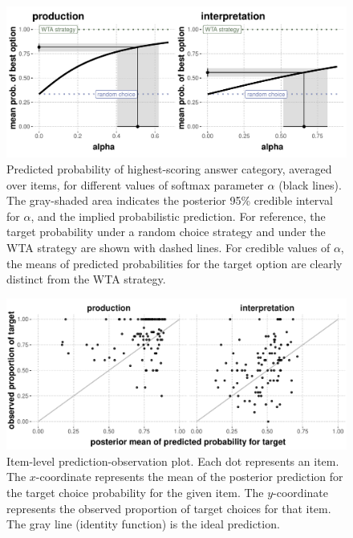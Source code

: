 \documentclass[fleqn]{article}
\begin{document}
\begin{figure}[t]
  \centering
  \includegraphics[width=\textwidth]{00-pics/GPT-closeness-target-by-alpha-item-level.pdf}
  \caption{
    Predicted probability of highest-scoring answer category, averaged over items, for different values of softmax parameter $\alpha$ (black lines).
    The gray-shaded area indicates the posterior 95\% credible interval for $\alpha$, and the implied probabilistic prediction.
    For reference, the target probability under a random choice strategy and under the WTA strategy are shown with dashed lines.
    For credible values of $\alpha$, the means of predicted probabilities for the target option are clearly distinct from the WTA strategy.
  }
  \label{fig:closeness-target-item-level}
\end{figure}

\begin{figure}[t]
  \centering

  \includegraphics[width = 0.9\linewidth]{00-pics/GPT-item-combined-obs-pred.pdf}

  \caption{
    Item-level prediction-observation plot.
    Each dot represents an item.
    The $x$-coordinate represents the mean of the posterior prediction for the target choice probability for the given item.
    The $y$-coordinate represents the observed proportion of target choices for that item.
    The gray line (identity function) is the ideal prediction.
  }
  \label{fig:item-level-obs-pred}
\end{figure}
\end{document}
